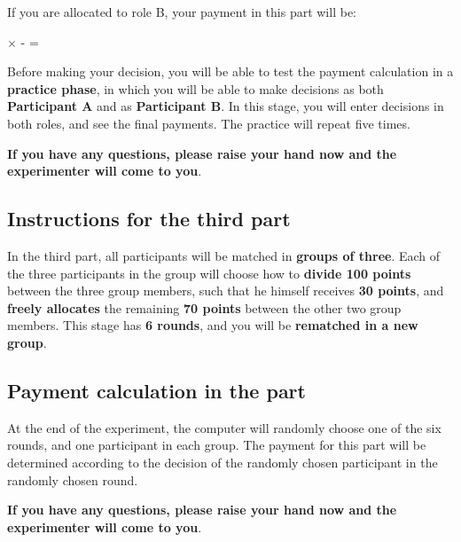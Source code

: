 If you are allocated to role B, your payment in this part will be:

{\medskip%
\begin{adjustwidth}{-0.6in}{-0.6in}
\large
\sffamily\centering
{} $\times$
 -
 =
\end{adjustwidth}
}\medskip

Before making your decision, you will be able to test the payment calculation in a \textbf{practice phase}, in which you will be able to make decisions as both \textbf{Participant A} and as \textbf{Participant B}. In this stage, you will enter decisions in both roles, and see the final payments. The practice will repeat five times. 

\textbf{If you have any questions, please raise your hand now and the experimenter will come to you}.

\newpage

\subsection*{Instructions for the third part}

In the third part, all participants will be matched in \textbf{groups of three}. Each of the three participants in the group will choose how to \textbf{divide 100 points} between the three group members, such that he himself receives \textbf{30 points}, and \textbf{freely allocates} the remaining \textbf{70 points} between the other two group members. This stage has \textbf{6 rounds}, and you will be \textbf{rematched in a new group}.

\subsection*{Payment calculation in the part}

At the end of the experiment, the computer will randomly choose one of the six rounds, and one participant in each group. The payment for this part will be determined according to the decision of the randomly chosen participant in the randomly chosen round.

\textbf{If you have any questions, please raise your hand now and the experimenter will come to you}.

\newpage

